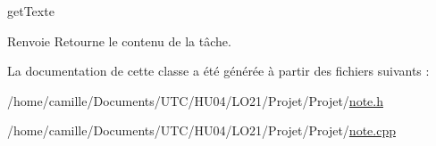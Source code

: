 get\-Texte 

\begin{DoxyReturn}{Renvoie}
Retourne le contenu de la tâche. 
\end{DoxyReturn}


La documentation de cette classe a été générée à partir des fichiers suivants \-:\begin{DoxyCompactItemize}
\item 
/home/camille/\-Documents/\-U\-T\-C/\-H\-U04/\-L\-O21/\-Projet/\-Projet/\hyperlink{note_8h}{note.\-h}\item 
/home/camille/\-Documents/\-U\-T\-C/\-H\-U04/\-L\-O21/\-Projet/\-Projet/\hyperlink{note_8cpp}{note.\-cpp}\end{DoxyCompactItemize}
